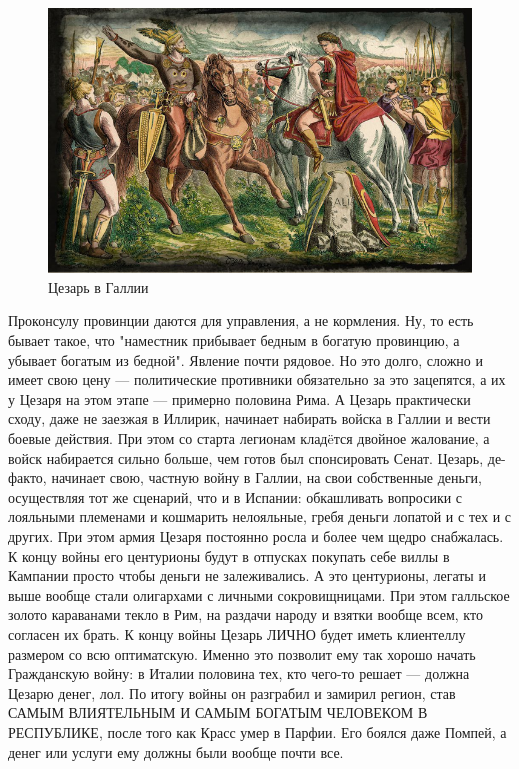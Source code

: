 \begin{figure}[h!tb]
	\centering\includegraphics[scale=0.5]{Data/Caesar_and_money/1623334301188197883.png}
	\caption{Цезарь в Галлии
	}
	\label{fig:gall} %
\end{figure}
Проконсулу провинции даются для управления, а не кормления. Ну, то есть бывает такое, что "наместник прибывает бедным в богатую провинцию, а убывает богатым из бедной". Явление почти рядовое. Но это долго, сложно и имеет свою цену — политические противники обязательно за это зацепятся, а их у Цезаря на этом этапе — примерно половина Рима. А Цезарь практически сходу, даже не заезжая в Иллирик, начинает набирать войска в Галлии и вести боевые действия. При этом со старта легионам кладëтся двойное жалование, а войск набирается сильно больше, чем готов был спонсировать Сенат. Цезарь, де-факто, начинает свою, частную войну в Галлии, на свои собственные деньги, осуществляя тот же сценарий, что и в Испании: обкашливать вопросики с лояльными племенами и кошмарить нелояльные, гребя деньги лопатой и с тех и с других. При этом армия Цезаря постоянно росла и более чем щедро снабжалась. К концу войны его центурионы будут в отпусках покупать себе виллы в Кампании просто чтобы деньги не залеживались. А это центурионы, легаты и выше вообще стали олигархами с личными сокровищницами. При этом галльское золото караванами текло в Рим, на раздачи народу и взятки вообще всем, кто согласен их брать. К концу войны Цезарь ЛИЧНО будет иметь клиентеллу размером со всю оптиматскую. Именно это позволит ему так хорошо начать Гражданскую войну: в Италии половина тех, кто чего-то решает — должна Цезарю денег, лол. По итогу войны он разграбил и замирил регион, став САМЫМ ВЛИЯТЕЛЬНЫМ И САМЫМ БОГАТЫМ ЧЕЛОВЕКОМ В РЕСПУБЛИКЕ, после того как Красс умер в Парфии. Его боялся даже Помпей, а денег или услуги ему должны были вообще почти все.


